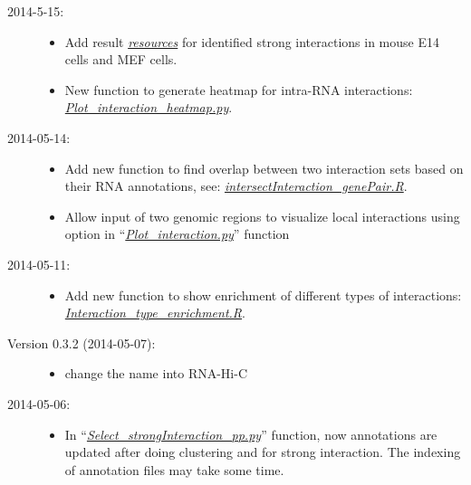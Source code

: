 \documentclass[letterpaper,10pt,english]{sphinxmanual}
\begin{document}
\begin{description}
\begin{itemize}
\end{itemize}

\item[{2014-5-15:}] \leavevmode\begin{itemize}
\item {} 
Add result {\hyperref[Data_Resources:resource]{\emph{resources}}} for identified strong interactions in mouse E14 cells and MEF cells.

\item {} 
New function to generate heatmap for intra-RNA interactions: {\hyperref[Visualization:visualizationheatmap]{\emph{Plot\_interaction\_heatmap.py}}}.

\end{itemize}

\item[{2014-05-14:}] \leavevmode\begin{itemize}
\item {} 
Add new function to find overlap between two interaction sets based on their RNA annotations, see: {\hyperref[Analysis_pipeline:intersectiongene]{\emph{intersectInteraction\_genePair.R}}}.

\item {} 
Allow input of two genomic regions to visualize local interactions using  option in ``{\hyperref[Visualization:plotinteraction]{\emph{Plot\_interaction.py}}}'' function

\end{itemize}

\item[{2014-05-11:}] \leavevmode\begin{itemize}
\item {} 
Add new function to show enrichment of different types of interactions: {\hyperref[Visualization:visualizationenrich]{\emph{Interaction\_type\_enrichment.R}}}.

\end{itemize}

\item[{Version 0.3.2 (2014-05-07):}] \leavevmode\begin{itemize}
\item {} 
change the name into RNA-Hi-C

\end{itemize}

\item[{2014-05-06:}] \leavevmode\begin{itemize}
\item {} 
In ``{\hyperref[Analysis_pipeline:step6]{\emph{Select\_strongInteraction\_pp.py}}}'' function, now annotations are updated after doing clustering and for strong interaction. The indexing of annotation files may take some time.


\end{itemize}
\end{description}
\end{document}
